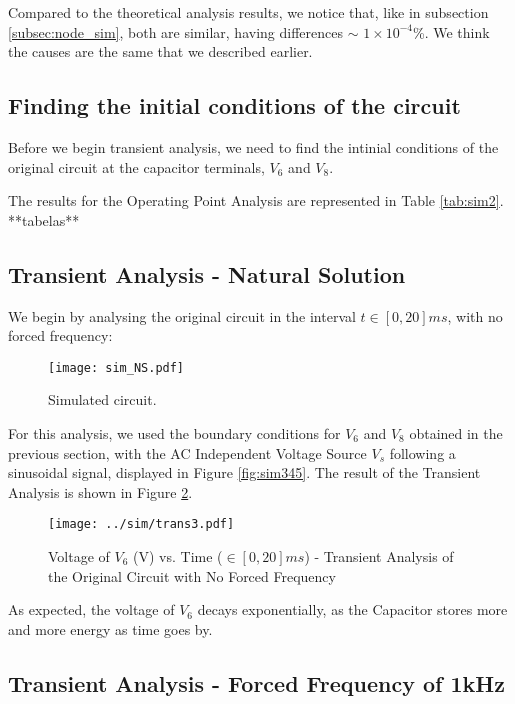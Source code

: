 Compared to the theoretical analysis results, we notice that, like in subsection \ref{subsec:node_sim}, both are similar, having differences $\sim$ $1\times10^{-4}$\%. We think the causes are the same that we described earlier.

\subsection{Finding the initial conditions of the circuit}
\label{subsec:init_conds}

Before we begin transient analysis, we need to find the intinial conditions of the original circuit at the capacitor terminals, $V_6$ and $V_8$.
\par
The results for the Operating Point Analysis are represented in Table \ref{tab:sim2}.
**tabelas**

\subsection{Transient Analysis - Natural Solution}
\label{subsec:trans_NS}

We begin by  analysing the original circuit in the interval $t \in [0, 20]ms$, with no forced frequency:

\begin{figure}[H] \centering
\texttt{[image: sim\_NS.pdf]}
\caption{Simulated circuit.}
\label{fig:sim_NS}
\end{figure}

For this analysis, we used the boundary conditions for $V_6$ and $V_8$ obtained in the previous section, with the AC Independent Voltage Source $V_s$ following a sinusoidal signal, displayed in Figure \ref{fig:sim345}. The result of the Transient Analysis is shown in Figure \ref{fig:sim-graph3}.

\begin{figure}[H] \centering
\texttt{[image: ../sim/trans3.pdf]}
\caption{Voltage of $V_6$ (V) vs. Time ($\in [0, 20]ms$) - Transient Analysis of the Original Circuit with No Forced Frequency}
\label{fig:sim-graph3}
\end{figure}

As expected, the voltage of $V_6$ decays exponentially, as the Capacitor stores more and more energy as time goes by.

\subsection{Transient Analysis - Forced Frequency of 1kHz}
\label{subsec:trans_FS}

